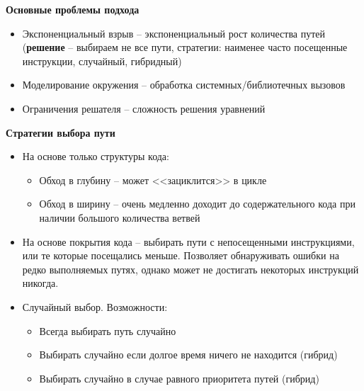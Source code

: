 \textbf{Основные проблемы подхода}
\begin{itemize}
    \item Экспоненциальный взрыв – экспоненциальный рост количества путей (\textbf{решение} – выбираем не все пути, стратегии: наименее часто посещенные инструкции, случайный, гибридный)
    \item Моделирование окружения – обработка системных/библиотечных вызовов
    \item Ограничения решателя – сложность решения уравнений
\end{itemize}

\textbf{Стратегии выбора пути}
\begin{itemize}
    \item На основе только структуры кода:
    \begin{itemize}
        \item Обход в глубину – может <<зациклится>> в цикле
        \item Обход в ширину – очень медленно доходит до содержательного кода при наличии большого количества ветвей
    \end{itemize}
    \item  На основе покрытия кода – выбирать пути с непосещенными инструкциями, или те которые посещались меньше. Позволяет обнаруживать ошибки на редко выполняемых путях, однако может не достигать некоторых инструкций никогда.
    \item Случайный выбор. Возможности:
    \begin{itemize}
        \item Всегда выбирать путь случайно
        \item Выбирать случайно если долгое время ничего не находится (гибрид)
        \item  Выбирать случайно в случае равного приоритета путей (гибрид)
    \end{itemize}
\end{itemize}